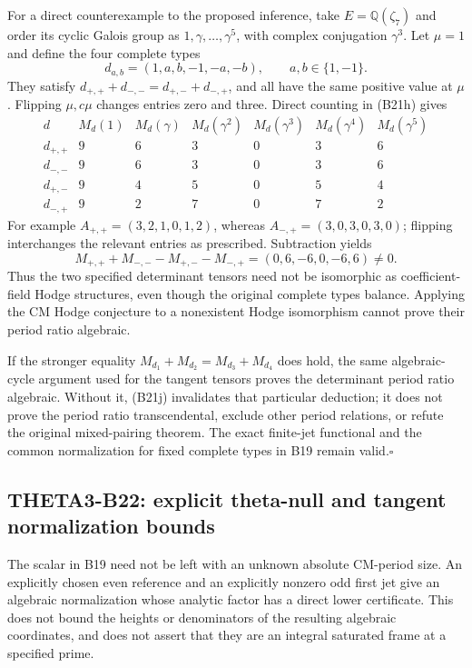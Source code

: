 \documentclass[11pt]{article}
\newcommand{\Q}{\mathbb Q}\newcommand{\C}{\mathbb C}\newcommand{\Z}{\mathbb Z}\newcommand{\R}{\mathbb R}\newcommand{\A}{\mathbb A}\newcommand{\OO}{\mathcal O}
\theoremstyle{definition}\newtheorem{definition}[theorem]{Definition}\newtheorem{remark}[theorem]{Remark}
\begin{document}
For a direct counterexample to the proposed inference, take
$E=\Q(\zeta_7)$ and order its cyclic Galois group as
$1,\gamma,\ldots,\gamma^5$, with complex conjugation
$\gamma^3$.  Let $\mu=1$ and define the four complete types
\[
 d_{a,b}=(1,a,b,-1,-a,-b),\qquad a,b\in\{1,-1\}.
\]
They satisfy $d_{+,+}+d_{-,-}=d_{+,-}+d_{-,+}$, and all
have the same positive value at $\mu$.
Flipping $\mu,c\mu$ changes entries zero and three.
Direct counting in (B21h) gives
\[
\begin{array}{c|rrrrrr}
 d&M_d(1)&M_d(\gamma)&M_d(\gamma^2)&M_d(\gamma^3)
       &M_d(\gamma^4)&M_d(\gamma^5)\\\hline
 d_{+,+}&9&6&3&0&3&6\\
 d_{-,-}&9&6&3&0&3&6\\
 d_{+,-}&9&4&5&0&5&4\\
 d_{-,+}&9&2&7&0&7&2
\end{array}
\]
For example $A_{+,+}=(3,2,1,0,1,2)$, whereas
$A_{-,+}=(3,0,3,0,3,0)$; flipping interchanges the relevant
entries as prescribed.  Subtraction yields
\[
 M_{+,+}+M_{-,-}-M_{+,-}-M_{-,+}
                         =(0,6,-6,0,-6,6)\ne0.
 \tag{B21j}
\]
Thus the two specified determinant tensors need not be
isomorphic as coefficient-field Hodge structures, even though
the original complete types balance.  Applying the CM Hodge
conjecture to a nonexistent Hodge isomorphism cannot prove
their period ratio algebraic.

If the stronger equality $M_{d_1}+M_{d_2}=M_{d_3}+M_{d_4}$
does hold, the same algebraic-cycle argument used for the
tangent tensors proves the determinant period ratio algebraic.
Without it, (B21j) invalidates that particular deduction; it
does not prove the period ratio transcendental, exclude other
period relations, or refute the original mixed-pairing theorem.
The exact finite-jet functional and the common normalization
for fixed complete types in B19 remain valid.\hfill$\square$


\subsection{THETA3-B22: explicit theta-null and tangent normalization bounds}\label{B22}

The scalar in B19 need not be left with an unknown absolute
CM-period size.  An explicitly chosen even reference and an
explicitly nonzero odd first jet give an algebraic normalization
whose analytic factor has a direct lower certificate.  This
does not bound the heights or denominators of the resulting
algebraic coordinates, and does not assert that they are an
integral saturated frame at a specified prime.
\end{document}
